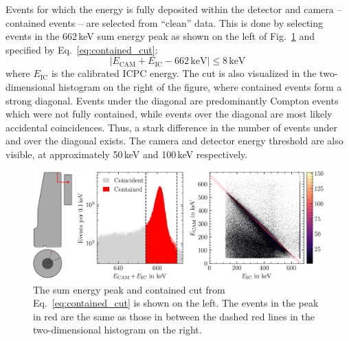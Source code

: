 Events for which the energy is fully deposited within the detector and camera -- contained events -- are selected from ``clean'' data. This is done by selecting events in the 662\,keV sum energy peak as shown on the left of Fig.~\ref{fig:z_reconstruction_energy} and specified by Eq.~\ref{eq:contained_cut}:
\begin{equation}
	\left|E_\text{CAM} + E_\text{IC} - 662\,\text{keV}\right| \leq 8\,\text{keV}~
	\label{eq:contained_cut}
\end{equation}
where $E_\text{IC}$ is the calibrated ICPC energy. The cut is also visualized in the two-dimensional histogram on the right of the figure, where contained events form a strong diagonal. Events under the diagonal are predominantly Compton events which were not fully contained, while events over the diagonal are most likely accidental coincidences. Thus, a stark difference in the number of events under and over the diagonal exists. The camera and detector energy threshold are also visible, at approximately 50\,keV and 100\,keV respectively. 
\begin{figure}[htb]
    \centering
    \includegraphics[width=6in]{figs/pipeline/z_reconstruction_energy.png}
    \caption{The sum energy peak and contained cut from Eq.~\ref{eq:contained_cut} is shown on the left. The events in the peak in red are the same as those in between the dashed red lines in the two-dimensional histogram on the right.}
    \label{fig:z_reconstruction_energy}
\end{figure}

